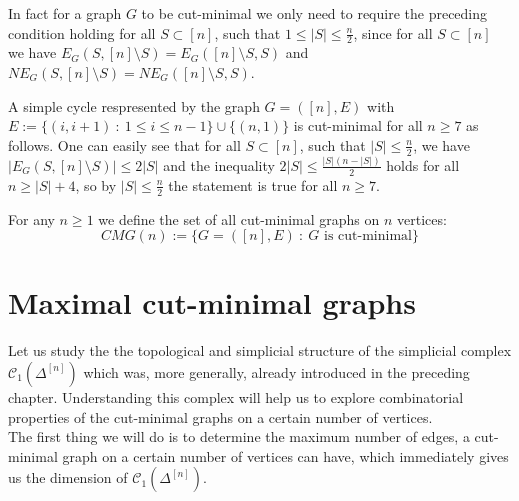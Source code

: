 \begin{rem}\label{remark1}
In fact for a graph \(G\) to be cut-minimal we only need to require the preceding condition holding for all \(S\subset [n]\), such that \(1\leq|S|\leq\frac{n}{2}\), since for all \(S\subset [n]\) we have \(E_G(S,[n]\setminus S)=E_G([n]\setminus S,S)\) and \(NE_G(S,[n]\setminus S)=NE_G([n]\setminus S,S)\).
\end{rem}

\begin{expl}
A simple cycle respresented by the graph \(G=([n],E)\) with\\
\(E:=\{(i,i+1)\: :\: 1\leq i\leq n-1\}\cup\{(n,1)\}\) is cut-minimal for all \(n\geq 7\) as follows. One can easily see that for all \(S\subset [n]\), such that \(|S|\leq\frac{n}{2}\), we have \(|E_G(S,[n]\setminus S)|\leq 2|S|\) and the inequality \(2|S|\leq\frac{|S|(n-|S|)}{2}\) holds for all \(n\geq |S|+4\), so by \(|S|\leq\frac{n}{2}\) the statement is true for all \(n\geq 7\).
\end{expl}

\begin{defi}
For any \(n\geq 1\) we define the set of all cut-minimal graphs on \(n\) vertices:
\[
CMG(n):=\{G=([n],E)\: :\: G\text{ is cut-minimal}\}
\]
\end{defi}

\section{Maximal cut-minimal graphs}

Let us study the the topological and simplicial structure of the simplicial complex \(\mathcal{C}_1(\Delta^{[n]})\) which was, more generally, already introduced in the preceding chapter. Understanding this complex will help us to explore combinatorial properties of the cut-minimal graphs on a certain number of vertices.\\
The first thing we will do is to determine the maximum number of edges, a cut-minimal graph on a certain number of vertices can have, which immediately gives us the dimension of \(\mathcal{C}_1(\Delta^{[n]})\).


